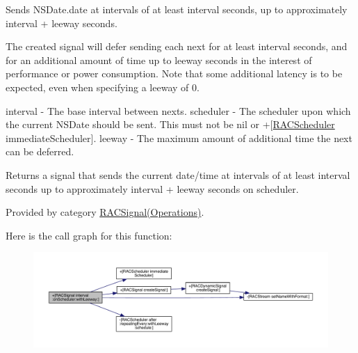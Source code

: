 Sends N\+S\+Date.\+date at intervals of at least {\ttfamily interval} seconds, up to approximately {\ttfamily interval} + {\ttfamily leeway} seconds.

The created signal will defer sending each {\ttfamily next} for at least {\ttfamily interval} seconds, and for an additional amount of time up to {\ttfamily leeway} seconds in the interest of performance or power consumption. Note that some additional latency is to be expected, even when specifying a {\ttfamily leeway} of 0.

interval -\/ The base interval between {\ttfamily next}s. scheduler -\/ The scheduler upon which the current N\+S\+Date should be sent. This must not be nil or +\mbox{[}\mbox{\hyperlink{interface_r_a_c_scheduler}{R\+A\+C\+Scheduler}} immediate\+Scheduler\mbox{]}. leeway -\/ The maximum amount of additional time the {\ttfamily next} can be deferred.

Returns a signal that sends the current date/time at intervals of at least {\ttfamily interval seconds} up to approximately {\ttfamily interval} + {\ttfamily leeway} seconds on {\ttfamily scheduler}. 

Provided by category \mbox{\hyperlink{category_r_a_c_signal_07_operations_08_acd968c129ec1afe3b5bc77db5fc13291}{R\+A\+C\+Signal(\+Operations)}}.

Here is the call graph for this function\+:\nopagebreak
\begin{figure}[H]
\begin{center}
\leavevmode
\includegraphics[width=350pt]{interface_r_a_c_signal_acd968c129ec1afe3b5bc77db5fc13291_cgraph}
\end{center}
\end{figure}
\mbox{\label{interface_r_a_c_signal_acd968c129ec1afe3b5bc77db5fc13291}} 
